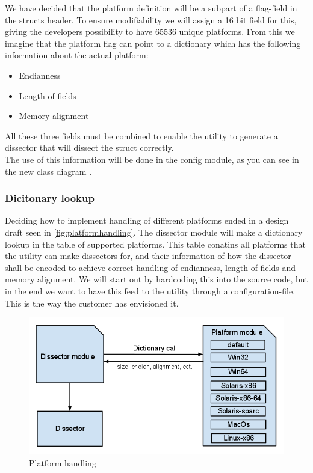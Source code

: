 We have decided that the platform definition will be a subpart of a flag-field in the structs header. To ensure modifiability we will assign a 16 bit field for this, giving the developers possibility to have 65536 unique platforms. From this we imagine that the platform flag can point to a dictionary which has the following information about the actual platform:
\begin{itemize}
\item Endianness
\item Length of fields
\item Memory alignment
\end{itemize}
All these three fields must be combined to enable the utility to generate a \gls{dissector} that will dissect the struct correctly.\\

The use of this information will be done in the config module, as you can see in the new class diagram .

\subsubsection{Dicitonary lookup}
Deciding how to implement handling of different platforms ended in a design draft seen in \autoref{fig:platformhandling}. The \gls{dissector} module will make a dictionary lookup in the table of supported platforms. This table conatins all platforms that the \gls{utility} can make \glspl{dissector} for, and their information of how the \gls{dissector} shall be encoded to achieve correct handling of \gls{endianness}, length of fields and memory alignment.
We will start out by hardcoding this into the source code, but in the end we want to have this feed to the \gls{utility} through a configuration-file. This is the way the customer has envisioned it.  

\begin{figure}[!htb]
	\includegraphics[width=\textwidth]{./sprints/img/platformhandling}
	\caption{Platform handling\label{fig:platformhandling}}
\end{figure}


